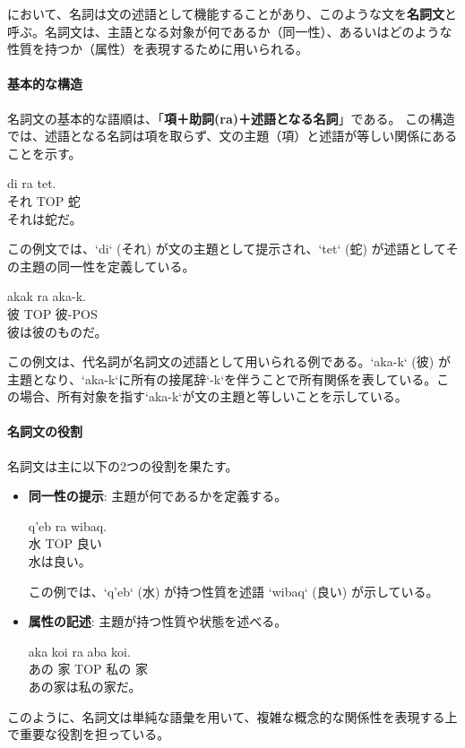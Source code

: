 

\langname において、名詞は文の述語として機能することがあり、このような文を\textbf{名詞文}と呼ぶ。名詞文は、主語となる対象が何であるか（同一性）、あるいはどのような性質を持つか（属性）を表現するために用いられる。

\paragraph{基本的な構造}
名詞文の基本的な語順は、「\textbf{項＋助詞(ra)＋述語となる名詞}」である。
この構造では、述語となる名詞は項を取らず、文の主題（項）と述語が等しい関係にあることを示す。

\begin{exe}
    \ex \gll di ra tet.\\
    それ TOP 蛇\\
    \glt それは蛇だ。
\end{exe}
この例文では、`di` (それ) が文の主題として提示され、`tet` (蛇) が述語としてその主題の同一性を定義している。

\begin{exe}
    \ex \gll akak ra aka-k.\\
    彼 TOP 彼-POS\\
    \glt 彼は彼のものだ。
\end{exe}
この例文は、代名詞が名詞文の述語として用いられる例である。`aka-k` (彼) が主題となり、`aka-k`に所有の接尾辞`-k`を伴うことで所有関係を表している。この場合、所有対象を指す`aka-k`が文の主題と等しいことを示している。

\paragraph{名詞文の役割}
名詞文は主に以下の2つの役割を果たす。
\begin{itemize}
    \item \textbf{同一性の提示}: 主題が何であるかを定義する。
    \begin{exe}
        \ex \gll q'eb ra wibaq.\\
        水 TOP 良い\\
        \glt 水は良い。
    \end{exe}
    この例では、`q'eb` (水) が持つ性質を述語 `wibaq` (良い) が示している。

    \item \textbf{属性の記述}: 主題が持つ性質や状態を述べる。
    \begin{exe}
        \ex \gll aka koi ra aba koi.\\
        あの 家 TOP 私の 家\\
        \glt あの家は私の家だ。
    \end{exe}
\end{itemize}
このように、名詞文は単純な語彙を用いて、複雑な概念的な関係性を表現する上で重要な役割を担っている。